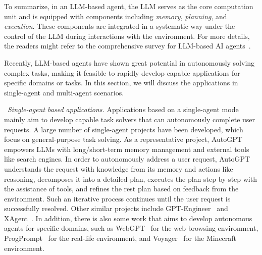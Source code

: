 {{
To summarize, in an LLM-based agent, the LLM serves as the core computation unit and is equipped with components including \textit{memory}, \textit{planning}, and \textit{execution}.
These components are integrated in a systematic way under the control of the LLM during interactions with the environment.
For more details, the readers might refer to the comprehensive survey for LLM-based AI agents~\cite{wang-arxiv-2023-a}. 
}

Recently, LLM-based agents have shown great potential in autonomously solving complex tasks, making it feasible to rapidly develop capable applications for specific domains or tasks. In this section, we will discuss the applications in single-agent and multi-agent scenarios. 
%

\textbullet~\emph{Single-agent based applications.}
{
Applications based on a single-agent mode mainly aim to develop capable task solvers that can autonomously complete user requests.
A large number of single-agent projects have been developed, which focus on general-purpose task solving. %
As a representative project, AutoGPT~\cite{AutoGPT} empowers LLMs with long/short-term memory management and external tools like search engines.
In order to autonomously address a user request, AutoGPT understands the request with knowledge from its memory and actions like reasoning, decomposes it into a detailed plan, executes the plan step-by-step with the assistance of tools, and refines the rest plan based on feedback from the environment. 
Such an iterative process continues until the user request is successfully resolved.
Other similar projects include GPT-Engineer~\cite{GPT-Engineer} and XAgent~\cite{xagent2023}.
In addition, there is also some work that aims to develop autonomous agents for specific domains, such as WebGPT~\cite{Nakano-arxiv-2021-WebGPT} for the web-browsing environment, ProgPrompt~\cite{Singh-arxiv-2022-ProgPrompt} for the real-life environment, and Voyager~\cite{Wang-arxiv-2023-Voyager} for the Minecraft environment.
}

}
